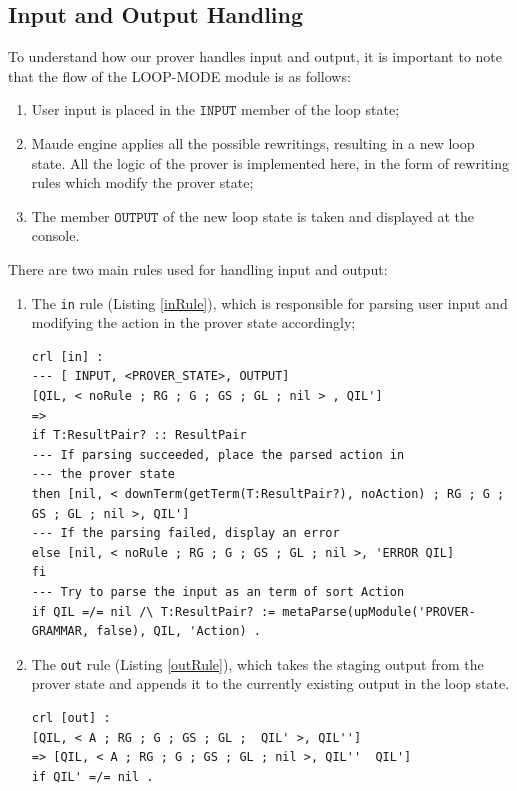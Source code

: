 \documentclass[12pt,a4paper]{article}
\begin{document}
{\subsection{Input and Output Handling}
To understand how our prover handles input and output, it is important to note that the flow of the LOOP-MODE module is as follows: 
\begin{enumerate}
	\item User input is placed in the \(\mathtt{INPUT}\) member of the loop state;
	\item Maude engine applies all the possible rewritings, resulting in a new loop state. All the logic of the prover is implemented here, in the form of rewriting rules which modify the prover state;
	\item The member \(\mathtt{OUTPUT}\) of the new loop state is taken and displayed at the console.
\end{enumerate}
There are two main rules used for handling input and output: 
\begin{enumerate}
	\item{The \texttt{in} rule (Listing \ref{inRule}), which is responsible for parsing user input and modifying the action in the prover state accordingly;}
	\begin{lstlisting}[caption=The \texttt{in} rule,label=inRule]
crl [in] : 
--- [ INPUT, <PROVER_STATE>, OUTPUT]
[QIL, < noRule ; RG ; G ; GS ; GL ; nil > , QIL']
=> 
if T:ResultPair? :: ResultPair  
--- If parsing succeeded, place the parsed action in
--- the prover state
then [nil, < downTerm(getTerm(T:ResultPair?), noAction) ; RG ; G ; GS ; GL ; nil >, QIL']  
--- If the parsing failed, display an error
else [nil, < noRule ; RG ; G ; GS ; GL ; nil >, 'ERROR QIL]  
fi  
--- Try to parse the input as an term of sort Action
if QIL =/= nil /\ T:ResultPair? := metaParse(upModule('PROVER-GRAMMAR, false), QIL, 'Action) .
\end{lstlisting}
	\item{The \texttt{out} rule (Listing \ref{outRule}), which takes the staging output from the prover state and appends it to the currently existing output in the loop state.}
	\begin{lstlisting}[caption=The \texttt{out} rule,label=outRule]
crl [out] :
[QIL, < A ; RG ; G ; GS ; GL ;  QIL' >, QIL'']
=> [QIL, < A ; RG ; G ; GS ; GL ; nil >, QIL''  QIL']
if QIL' =/= nil .
\end{lstlisting}
\end{enumerate}

}
\end{document}
